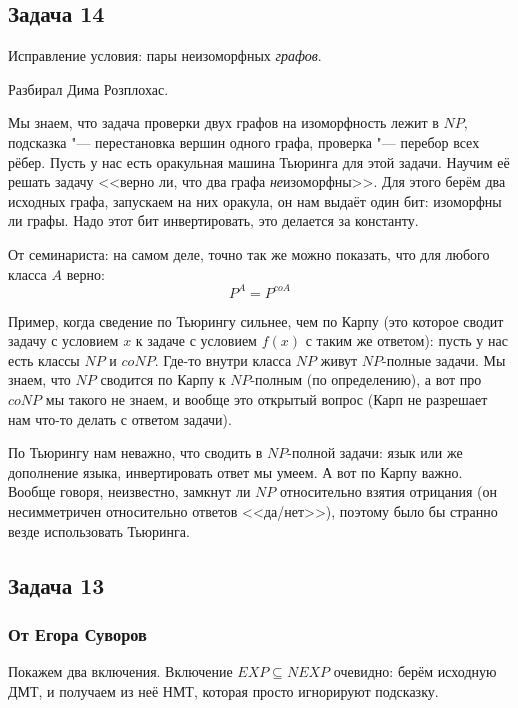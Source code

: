 \subsection{Задача 14}
	Исправление условия: пары неизоморфных \textit{графов}.

	Разбирал Дима Розплохас.

	Мы знаем, что задача проверки двух графов на изоморфность лежит в $NP$,
	подсказка "--- перестановка вершин одного графа, проверка "--- перебор всех рёбер.
	Пусть у нас есть оракульная машина Тьюринга для этой задачи.
	Научим её решать задачу <<верно ли, что два графа \textit{не}изоморфны>>.
	Для этого берём два исходных графа, запускаем на них оракула, он нам выдаёт
	один бит: изоморфны ли графы.
	Надо этот бит инвертировать, это делается за константу.

	\begin{Rem}
		От семинариста: на самом деле, точно так же можно показать, что для любого
		класса $A$ верно:
		\[ P^A = P^{coA} \]
	\end{Rem}
	\begin{Rem}\label{task_14_rem_turing}
		Пример, когда сведение по Тьюрингу сильнее, чем по Карпу (это которое сводит задачу
		с условием $x$ к задаче с условием $f(x)$ с таким же ответом):
		пусть у нас есть классы $NP$ и $coNP$.
		Где-то внутри класса $NP$ живут $NP$-полные задачи.
		Мы знаем, что $NP$ сводится по Карпу к $NP$-полным (по определению),
		а вот про $coNP$ мы такого не знаем, и вообще это открытый вопрос (Карп не разрешает нам что-то делать
		с ответом задачи).

		По Тьюрингу нам неважно, что сводить в $NP$-полной задачи: язык или же дополнение языка,
		инвертировать ответ мы умеем.
		А вот по Карпу важно.
		Вообще говоря, неизвестно, замкнут ли $NP$ относительно взятия отрицания (он несимметричен относительно
		ответов <<да/нет>>), поэтому было бы странно везде использовать Тьюринга.
	\end{Rem}

\subsection{Задача 13}
	\subsubsection{От Егора Суворов}
		Покажем два включения.
		Включение $EXP \subseteq NEXP$ очевидно: берём исходную ДМТ, и получаем
		из неё НМТ, которая просто игнорируют подсказку.

